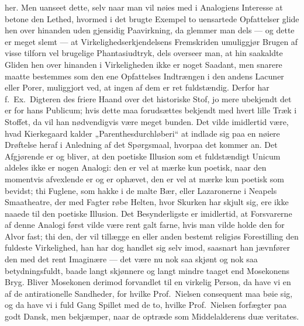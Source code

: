 her. Men uanseet dette, selv naar man vil nøies med i Analogiens Interesse at
betone den Lethed, hvormed i det brugte Exempel to uensartede Opfattelser
glide hen over hinanden uden gjensidig Paavirkning, da glemmer man dels ---
og dette er meget slemt --- at Virkelighedserkjendelsens Fremskriden
umuliggjør Brugen af visse tilforn vel brugelige
Phantasiudtryk, dels
overseer man, at hin saakaldte Gliden hen over hinanden i Virkeligheden ikke
er noget Saadant, men snarere maatte bestemmes som den ene Opfattelses
Indtrængen i den andens Lacuner eller Porer, muliggjort ved, at ingen af dem
er ret fuldstændig. Derfor har f.\ Ex.\ Digteren des friere Haand over det
historiske Stof, jo mere ubekjendt det er for hans Publicum; hvis dette maa
forudsættes bekjendt med hvert lille Træk i Stoffet, da vil han nødvendigvis
være meget bunden. Det vilde imidlertid være, hvad Kierkegaard kalder
„Parenthesdurchløberi“ at indlade sig paa en nøiere Drøftelse heraf i
Anledning af det Spørgsmaal, hvorpaa det kommer an. Det Afgjørende
er og bliver, at den poetiske Illusion som et fuldstændigt Unicum aldeles
ikke er nogen Analogi: den er vel at mærke kun poetisk, naar den momentvis
afvexlende er og er ophævet, den er vel at mærke kun poetisk som bevidst; thi
Fuglene, som hakke i de malte Bær, eller Lazaronerne i Neapels Smaatheatre,
der med Fagter røbe Helten, hvor Skurken har skjult sig, ere ikke naaede til
den poetiske Illusion. Det Besynderligste er imidlertid, at Forsvarerne af
denne Analogi først vilde være rent galt farne, hvis man vilde holde den for
Alvor fast; thi den, der vil tillægge en eller anden bestemt religiøs
Forestilling den fuldeste Virkelighed, han har dog handlet sig selv imod,
saasnart han jævnfører den med det rent Imaginære --- det være nu nok saa
skjønt og nok saa betydningsfuldt, baade langt skjønnere og langt mindre
taaget end Mosekonens Bryg. Bliver Mosekonen derimod forvandlet til en
virkelig Person, da have vi en af de antirationelle Sandheder, for hvilke
Prof.\ Nielsen consequent maa bøie sig, og da have vi i fuld Gang Spillet med
de to, hvilke Prof.\ Nielsen forfægter paa godt Dansk, men bekjæmper, naar de
optræde som Middelalderens duæ veritates.

